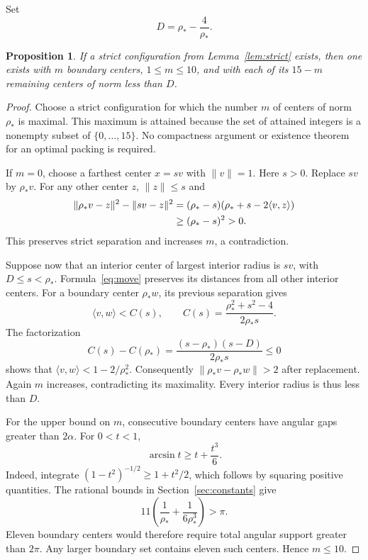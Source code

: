 \documentclass[11pt]{amsart}
\newtheorem{proposition}[theorem]{Proposition}
\theoremstyle{definition}
\theoremstyle{remark}
\numberwithin{equation}{section}
\newcommand{\norm}[1]{\lVert #1\rVert}
\newcommand{\rhoopt}{\rho_*}
\begin{document}
Set
\begin{equation}\label{eq:D}
 D=\rhoopt-\frac4{\rhoopt}.
\end{equation}
\begin{proposition}\label{prop:normalize}
If a strict configuration from Lemma~\ref{lem:strict} exists, then one exists
with $m$ boundary centers, $1\leq m\leq10$, and with each of its $15-m$
remaining centers of norm less than $D$.
\end{proposition}
\begin{proof}
Choose a strict configuration for which the number $m$ of centers of norm
$\rhoopt$ is maximal. This maximum is attained because the set of attained
integers is a nonempty subset of $\{0,\ldots,15\}$. No compactness argument
or existence theorem for an optimal packing is required.

If $m=0$, choose a farthest center $x=sv$ with $\norm{v}=1$. Here $s>0$.
Replace $sv$ by $\rhoopt v$. For any other center $z$, $\norm{z}\leq s$ and
\begin{align}\label{eq:move}
 \norm{\rhoopt v-z}^2-\norm{sv-z}^2
 &= (\rhoopt-s)(\rhoopt+s-2\langle v,z\rangle)\\
 &\geq (\rhoopt-s)^2>0.\notag
\end{align}
This preserves strict separation and increases $m$, a contradiction.

Suppose now that an interior center of largest interior radius is $sv$,
with $D\leq s<\rhoopt$. Formula~\eqref{eq:move} preserves its distances
from all other interior centers. For a boundary center $\rhoopt w$, its
previous separation gives
\[
 \langle v,w\rangle<C(s),\qquad
 C(s)=\frac{\rhoopt^2+s^2-4}{2\rhoopt s}.
\]
The factorization
\begin{equation}\label{eq:factor}
 C(s)-C(\rhoopt)=
 \frac{(s-\rhoopt)(s-D)}{2\rhoopt s}\leq0
\end{equation}
shows that $\langle v,w\rangle<1-2/\rhoopt^2$. Consequently
$\norm{\rhoopt v-\rhoopt w}>2$ after replacement. Again $m$ increases,
contradicting its maximality. Every interior radius is thus less than $D$.

For the upper bound on $m$, consecutive boundary centers have angular gaps
greater than $2\alpha$. For $0<t<1$,
\begin{equation}\label{eq:asin}
 \arcsin t\geq t+\frac{t^3}{6}.
\end{equation}
Indeed, integrate $(1-t^2)^{-1/2}\geq1+t^2/2$, which follows by squaring
positive quantities. The rational bounds in Section~\ref{sec:constants}
give
\[
 11\left(\frac1{\rhoopt}+\frac1{6\rhoopt^3}\right)>\pi.
\]
Eleven boundary centers would therefore require total angular support
greater than $2\pi$. Any larger boundary set contains eleven such centers.
Hence $m\leq10$.
\end{proof}
\end{document}
